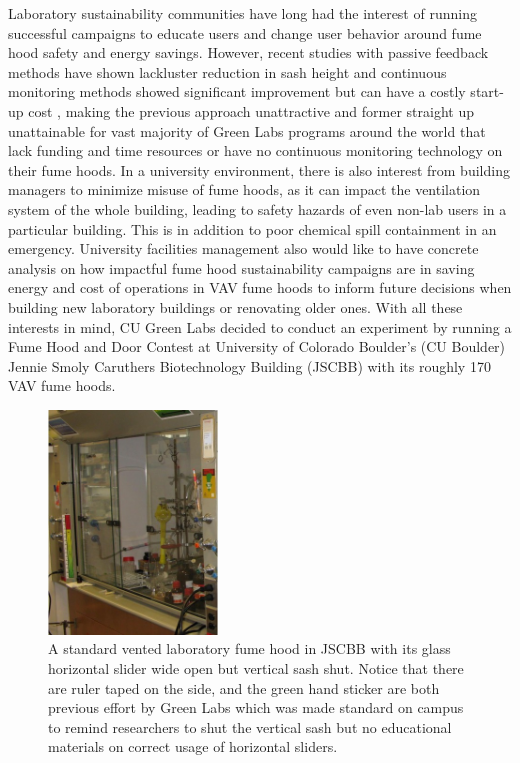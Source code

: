 \documentclass[12pt, twocolumn]{article}
\begin{document}
Laboratory sustainability communities have long had the interest of running successful campaigns to educate users and change user behavior around fume hood safety and energy savings. However, recent studies with passive feedback methods have shown lackluster reduction in sash height \cite{Wesolowski2010} and continuous monitoring methods showed significant improvement but can have a costly start-up cost \cite{Kongoletos2021}, making the previous approach unattractive and former straight up unattainable for vast majority of Green Labs programs around the world that lack funding and time resources or have no continuous monitoring technology on their fume hoods. In a university environment, there is also interest from building managers to minimize misuse of fume hoods, as it can impact the ventilation system of the whole building, leading to safety hazards of even non-lab users in a particular building. This is in addition to poor chemical spill containment in an emergency. University facilities management also would like to have concrete analysis on how impactful fume hood sustainability campaigns are in saving energy and cost of operations in VAV fume hoods to inform future decisions when building new laboratory buildings or renovating older ones. With all these interests in mind, CU Green Labs decided to conduct an experiment by running a Fume Hood and Door Contest at University of Colorado Boulder's (CU Boulder) Jennie Smoly Caruthers Biotechnology Building (JSCBB) with its roughly 170 VAV fume hoods. 
	
\begin{figure}[ht]	
	\centering
	\includegraphics[width=0.4\textwidth]{Images/Other_JSCBBFumeHood.jpg}
	\caption{A standard vented laboratory fume hood in JSCBB with its glass horizontal slider wide open but vertical sash shut. Notice that there are ruler taped on the side, and the green hand sticker are both previous effort by Green Labs which was made standard on campus to remind researchers to shut the vertical sash but no educational materials on correct usage of horizontal sliders. }
	\label{Fig:StandardFumeHoodJSCBB}
\end{figure}
\end{document}
